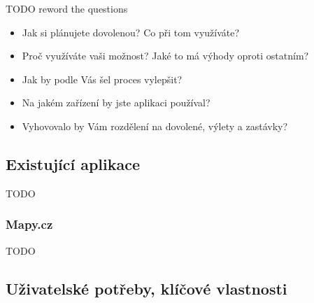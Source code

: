 \documentclass{article}
\begin{document}
TODO reword the questions


\begin{itemize}
    \item Jak si plánujete dovolenou? Co při tom využíváte?
    \item Proč využíváte vaši možnost? Jaké to má výhody oproti ostatním?
    \item Jak by podle Vás šel proces vylepšit?
    \item Na jakém zařízení by jste aplikaci používal?
    \item Vyhovovalo by Vám rozdělení na dovolené, výlety a zastávky?
\end{itemize}


\subsection{Existující aplikace}

TODO

\subsubsection{Mapy.cz}
TODO

\subsection{Uživatelské potřeby, klíčové vlastnosti}
\end{document}
